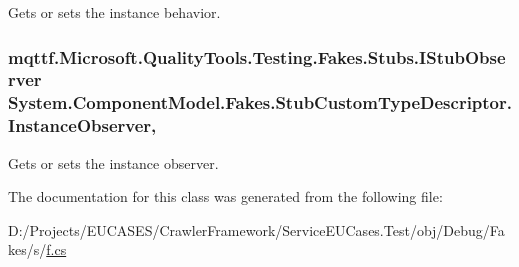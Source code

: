 Gets or sets the instance behavior.

\hypertarget{class_system_1_1_component_model_1_1_fakes_1_1_stub_custom_type_descriptor_afba67a70deda858fe5d55708f9fd48b9}{
\subsubsection[{Instance\-Observer}]{\setlength{\rightskip}{0pt plus 5cm}mqttf.\-Microsoft.\-Quality\-Tools.\-Testing.\-Fakes.\-Stubs.\-I\-Stub\-Observer System.\-Component\-Model.\-Fakes.\-Stub\-Custom\-Type\-Descriptor.\-Instance\-Observer\hspace{0.3cm}{\ttfamily [get]}, {\ttfamily [set]}}}\label{class_system_1_1_component_model_1_1_fakes_1_1_stub_custom_type_descriptor_afba67a70deda858fe5d55708f9fd48b9}


Gets or sets the instance observer.



The documentation for this class was generated from the following file\-:\begin{DoxyCompactItemize}
\item 
D\-:/\-Projects/\-E\-U\-C\-A\-S\-E\-S/\-Crawler\-Framework/\-Service\-E\-U\-Cases.\-Test/obj/\-Debug/\-Fakes/s/\hyperlink{s_2f_8cs}{f.\-cs}\end{DoxyCompactItemize}
